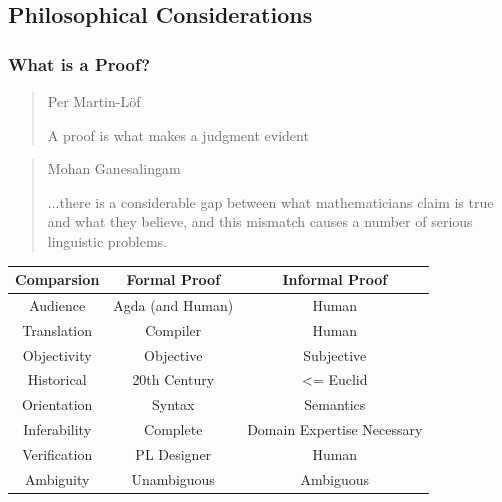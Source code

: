 \documentclass[10pt]{beamer}
\begin{document}
\subsection{Philosophical Considerations}

\begin{frame}

\frametitle{What is a Proof?}

\begin{quote}{Per Martin-Löf}

A proof is what makes a judgment evident %

\end{quote}


\end{frame}


\begin{frame}


\begin{quote}{Mohan Ganesalingam}

...there is a considerable gap between what mathematicians claim is true and what
they believe, and this mismatch causes a number of serious linguistic problems.

\end{quote}

\end{frame}


\begin{frame}



\centering




\begin{tabular}{|c|c|c|} \hline
  Comparsion & Formal Proof & Informal Proof \\ \hline
  Audience & Agda (and Human) & Human \\ \hline
  Translation & Compiler & Human \\ \hline
  Objectivity & Objective & Subjective \\ \hline %
  Historical & 20th Century & <= Euclid \\ \hline
  Orientation & Syntax & Semantics \\ \hline
  Inferability & Complete & Domain Expertise Necessary \\ \hline
  Verification & PL Designer & Human \\ \hline
  Ambiguity & Unambiguous & Ambiguous \\ \hline

\end{tabular}


\end{frame}
\end{document}
